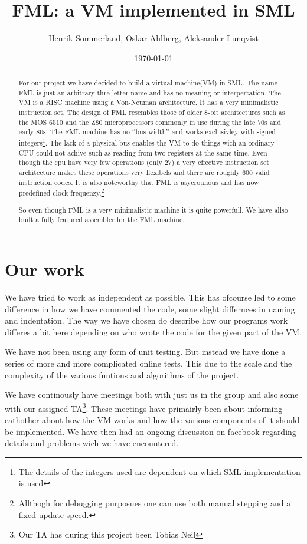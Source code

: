 \documentclass{article}
\title{FML: a VM implemented in SML}
\author{Henrik Sommerland, Oskar Ahlberg, Aleksander Lunqvist}
\date{\today}
\begin{document}
\maketitle

\begin{abstract}
For our project we have decided to build a virtual 
machine(VM) in SML.
The name FML is just an arbitrary thre letter name and has no meaning or interpertation.
The VM is a RISC machine using a Von-Neuman architecture. It has a very
minimalistic instruction set. The design of FML resembles those of older 8-bit
architectures such as the MOS 6510 and the Z80 microprocessors commonly in use
during the late 70s and early 80s. The FML machine has no ``bus width'' and 
works exclusivley with signed integers\footnote{The details of the integers
used are dependent on which SML implementation is used}. The lack of a physical
bus enables the VM to do things wich an ordinary CPU could not achive such as
reading from two registers at the same time. Even though
the cpu have very few operations (only 27) a very effective instruction set architecture
makes these operations very flexibels and there are roughly 600 valid    
instruction codes. It is also noteworthy that FML is asycrounous and has now
predefined clock frequenzy.\footnote{Allthogh for debugging purposues one can
use both manual stepping and a fixed update speed.}

So even though FML is a very minimalistic machine it is quite powerfull.
We have allso built a fully featured assembler for the FML machine.
\end{abstract}
\newpage
\tableofcontents
\newpage
\section{Our work}
We have tried to work as independent as possible. This has ofcourse led to some
difference in how we have commented the code, some slight differnces in naming
and indentation. The way we have chosen do describe how our programs work
differes a bit here depending on who wrote the code for the given part of the
VM.

We have not been using any form of unit testing. But instead we have done a
series of more and more complicated online tests. This due to the scale and the
complexity of the various funtions and algorithms of the project.

We have continously have meetings both with just us in the group and also some
with our assigned TA\footnote{Our TA has during this project been Tobias Neil}.
These meetings have primairly been about informing eathother about how the 
VM works and how the various components of it should be
implemented. We have then had an ongoing discussion on facebook regarding
details and problems wich we have encountered.
\end{document}
